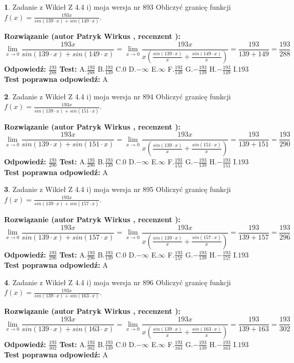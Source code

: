 \documentclass[12pt, a4paper]{article}
\theoremstyle{definition} %
\newtheorem{zad}{}
\newcommand{\zadStart}[1]{\begin{zad}#1\newline}
\newcommand{\zadStop}{\end{zad}}
\newcommand{\rozwStart}[2]{\noindent \textbf{Rozwiązanie (autor #1 , recenzent #2): }\newline}
\newcommand{\rozwStop}{\newline}
\newcommand{\odpStart}{\noindent \textbf{Odpowiedź:}\newline}
\newcommand{\odpStop}{\newline}
\newcommand{\testStart}{\noindent \textbf{Test:}\newline}
\newcommand{\testStop}{\newline}
\newcommand{\kluczStart}{\noindent \textbf{Test poprawna odpowiedź:}\newline}
\newcommand{\kluczStop}{\newline}
\begin{document}
\zadStart{Zadanie z Wikieł Z 4.4 i) moja wersja nr 893}
Obliczyć granicę funkcji $f(x)=\frac{193x}{sin(139\cdot x) +sin(149\cdot x)}$.
\zadStop
\rozwStart{Patryk Wirkus}{}
$$\lim\limits_{x\to 0}\frac{193x}{sin(139\cdot x) +sin(149\cdot x)}=\lim\limits_{x\to 0}\frac{193x}{x(\frac{sin(139\cdot x)}{x}+\frac{sin(149\cdot x)}{x})}=\frac{193}{139+149} = \frac{193}{288}$$
\rozwStop
\odpStart
$\frac{193}{288}$
\odpStop
\testStart
A.$\frac{193}{288}$
B.$\frac{193}{139}$
C.$0$
D.$-\infty$
E.$\infty$
F.$\frac{193}{149}$
G.$-\frac{193}{139}$
H.$-\frac{193}{149}$
I.$193$
\testStop
\kluczStart
A
\kluczStop



\zadStart{Zadanie z Wikieł Z 4.4 i) moja wersja nr 894}
Obliczyć granicę funkcji $f(x)=\frac{193x}{sin(139\cdot x) +sin(151\cdot x)}$.
\zadStop
\rozwStart{Patryk Wirkus}{}
$$\lim\limits_{x\to 0}\frac{193x}{sin(139\cdot x) +sin(151\cdot x)}=\lim\limits_{x\to 0}\frac{193x}{x(\frac{sin(139\cdot x)}{x}+\frac{sin(151\cdot x)}{x})}=\frac{193}{139+151} = \frac{193}{290}$$
\rozwStop
\odpStart
$\frac{193}{290}$
\odpStop
\testStart
A.$\frac{193}{290}$
B.$\frac{193}{139}$
C.$0$
D.$-\infty$
E.$\infty$
F.$\frac{193}{151}$
G.$-\frac{193}{139}$
H.$-\frac{193}{151}$
I.$193$
\testStop
\kluczStart
A
\kluczStop



\zadStart{Zadanie z Wikieł Z 4.4 i) moja wersja nr 895}
Obliczyć granicę funkcji $f(x)=\frac{193x}{sin(139\cdot x) +sin(157\cdot x)}$.
\zadStop
\rozwStart{Patryk Wirkus}{}
$$\lim\limits_{x\to 0}\frac{193x}{sin(139\cdot x) +sin(157\cdot x)}=\lim\limits_{x\to 0}\frac{193x}{x(\frac{sin(139\cdot x)}{x}+\frac{sin(157\cdot x)}{x})}=\frac{193}{139+157} = \frac{193}{296}$$
\rozwStop
\odpStart
$\frac{193}{296}$
\odpStop
\testStart
A.$\frac{193}{296}$
B.$\frac{193}{139}$
C.$0$
D.$-\infty$
E.$\infty$
F.$\frac{193}{157}$
G.$-\frac{193}{139}$
H.$-\frac{193}{157}$
I.$193$
\testStop
\kluczStart
A
\kluczStop



\zadStart{Zadanie z Wikieł Z 4.4 i) moja wersja nr 896}
Obliczyć granicę funkcji $f(x)=\frac{193x}{sin(139\cdot x) +sin(163\cdot x)}$.
\zadStop
\rozwStart{Patryk Wirkus}{}
$$\lim\limits_{x\to 0}\frac{193x}{sin(139\cdot x) +sin(163\cdot x)}=\lim\limits_{x\to 0}\frac{193x}{x(\frac{sin(139\cdot x)}{x}+\frac{sin(163\cdot x)}{x})}=\frac{193}{139+163} = \frac{193}{302}$$
\rozwStop
\odpStart
$\frac{193}{302}$
\odpStop
\testStart
A.$\frac{193}{302}$
B.$\frac{193}{139}$
C.$0$
D.$-\infty$
E.$\infty$
F.$\frac{193}{163}$
G.$-\frac{193}{139}$
H.$-\frac{193}{163}$
I.$193$
\testStop
\kluczStart
A
\kluczStop
\end{document}
